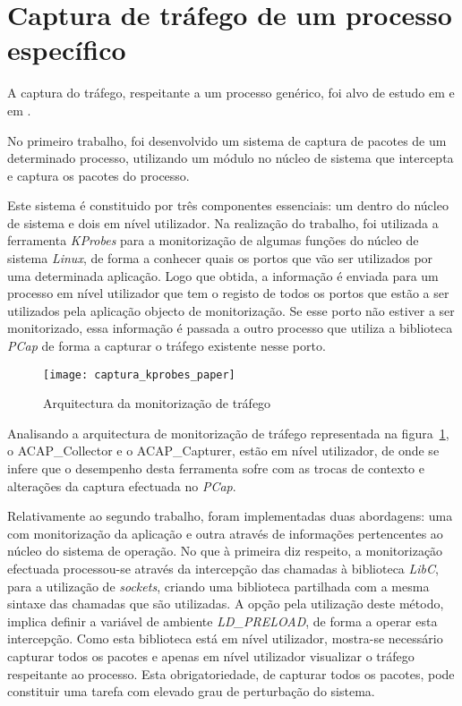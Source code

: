 \section{Captura de tráfego de um processo específico}
\label{sect:outras_abordagens}

A captura do tráfego, respeitante a um processo genérico, foi alvo de estudo em \cite{1688981} e em \cite{duarte10,Farruca:2009}.

No primeiro trabalho, foi desenvolvido um sistema de captura de pacotes de um determinado processo, utilizando um módulo no núcleo de sistema que intercepta e captura os pacotes do processo.

Este sistema é constituido por três componentes essenciais: um dentro do núcleo de sistema e dois em nível utilizador.
Na realização do trabalho, foi utilizada a ferramenta \textit{KProbes} para a monitorização de algumas funções do núcleo de sistema \textit{Linux}, de forma a conhecer quais os portos que vão ser utilizados por uma determinada aplicação.
Logo que obtida, a informação é enviada para um processo em nível utilizador que tem o registo de todos os portos que estão a ser utilizados pela aplicação objecto de monitorização.
Se esse porto não estiver a ser monitorizado, essa informação é passada a outro processo que utiliza a biblioteca \textit{PCap} de forma a capturar o tráfego existente nesse porto.


\begin{figure}[h!]
       \centering
       \texttt{[image: captura\_kprobes\_paper]}
       \caption{Arquitectura da monitorização de tráfego \cite{1688981}}
	\label{fig:paper_capture_kprobes}
\end{figure}


Analisando a arquitectura de monitorização de tráfego representada na figura~\ref{fig:paper_capture_kprobes}, o ACAP\_Collector e o ACAP\_Capturer, estão em nível utilizador, de onde se infere que o desempenho desta ferramenta sofre com as trocas de contexto e alterações da captura efectuada no \textit{PCap}.

Relativamente ao segundo trabalho, foram implementadas duas abordagens: uma com monitorização da aplicação e outra através de informações pertencentes ao núcleo do sistema de operação.
No que à primeira diz respeito, a monitorização efectuada processou-se através da intercepção das chamadas à biblioteca \textit{LibC}, para a utilização de \textit{sockets}, criando uma biblioteca partilhada com a mesma sintaxe das chamadas que são utilizadas.
A opção pela utilização deste método, implica definir a variável de ambiente \textit{LD\_PRELOAD}, de forma a operar esta intercepção.
Como esta biblioteca está em nível utilizador, mostra-se necessário capturar todos os pacotes e apenas em nível utilizador visualizar o tráfego respeitante ao processo.
Esta obrigatoriedade, de capturar todos os pacotes, pode constituir uma tarefa com elevado grau de perturbação do sistema.

